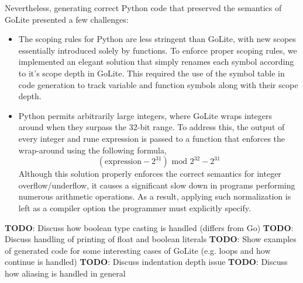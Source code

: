 \documentclass{article}
\begin{document}
Nevertheless, generating correct Python code that preserved the semantics of GoLite presented a few challenges:
\begin{itemize}
\item The scoping rules for Python are less stringent than GoLite, with new scopes essentially introduced solely by functions. To enforce proper scoping rules, we implemented an elegant solution that simply renames each symbol according to it's scope depth in GoLite. This required the use of the symbol table in code generation to track variable and function symbols along with their scope depth.
\item Python permits arbitrarily large integers, where GoLite wraps integers around when they surpass the 32-bit range. To address this, the output of every integer and rune expression is passed to a function that enforces the wrap-around using the following formula,
\begin{equation}
(\mbox{expression} - 2^{31}) \mbox{ mod } 2^{32} - 2^{31}
\end{equation}
Although this solution properly enforces the correct semantics for integer overflow/underflow, it causes a significant slow down in programs performing numerous arithmetic operations. As a result, applying such normalization is left as a compiler option the programmer must explicitly specify.
\end{itemize}

\textbf{TODO}: Discuss how boolean type casting is handled (differs from Go)
\textbf{TODO}: Discuss handling of printing of float and boolean literals
\textbf{TODO}: Show examples of generated code for some interesting cases of GoLite (e.g. loops and how continue is handled)
\textbf{TODO}: Discuss indentation depth issue
\textbf{TODO}: Discuss how aliasing is handled in general
\end{document}
